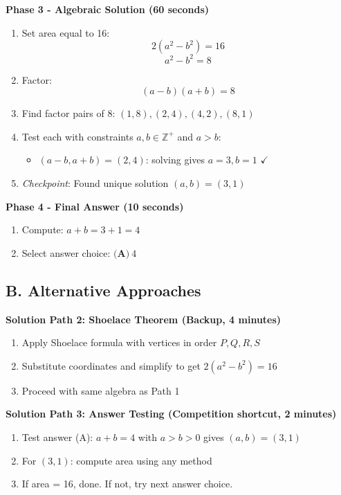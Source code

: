 \documentclass[]{article}
\begin{document}
\begin{solutionbox}
\textbf{Phase 3 - Algebraic Solution (60 seconds)}
\begin{enumerate}
    \item Set area equal to 16:
    $$2(a^2-b^2) = 16$$
    $$a^2 - b^2 = 8$$
    \item Factor:
    $$(a-b)(a+b) = 8$$
    \item Find factor pairs of 8: $(1,8), (2,4), (4,2), (8,1)$
    \item Test each with constraints $a,b \in \mathbb{Z}^+$ and $a>b$:
    \begin{itemize}
        \item $(a-b, a+b) = (2,4)$: solving gives $a=3, b=1$ $\checkmark$
    \end{itemize}
    \item \textit{Checkpoint}: Found unique solution $(a,b) = (3,1)$
\end{enumerate}

\textbf{Phase 4 - Final Answer (10 seconds)}
\begin{enumerate}
    \item Compute: $a + b = 3 + 1 = 4$
    \item Select answer choice: $\boxed{\textbf{(A)}\ 4}$
\end{enumerate}

\subsection*{B. Alternative Approaches}

\textbf{Solution Path 2: Shoelace Theorem (Backup, 4 minutes)}
\begin{enumerate}
    \item Apply Shoelace formula with vertices in order $P,Q,R,S$
    \item Substitute coordinates and simplify to get $2(a^2-b^2) = 16$
    \item Proceed with same algebra as Path 1
\end{enumerate}

\textbf{Solution Path 3: Answer Testing (Competition shortcut, 2 minutes)}
\begin{enumerate}
    \item Test answer (A): $a+b=4$ with $a>b>0$ gives $(a,b)=(3,1)$
    \item For $(3,1)$: compute area using any method
    \item If area = 16, done. If not, try next answer choice.
\end{enumerate}


\end{solutionbox}
\end{document}
